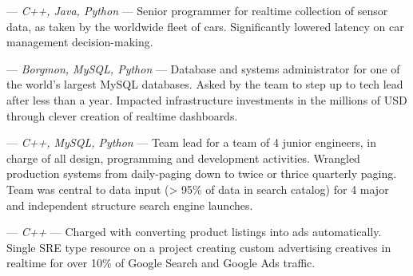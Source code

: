 \vspace{4 mm}

\begin{langen}
\begin{description}%
\vspace{2 mm}
\item[Street View] --- \textit{C++, Java, Python} --- Senior programmer for realtime collection of sensor data, as taken by the worldwide fleet of cars. Significantly lowered latency on car management decision-making.
\item[Ads-SRE-DB] --- \textit{Borgmon, MySQL, Python} --- Database and systems administrator for one of the world's largest MySQL databases. Asked by the team to step up to tech lead after less than a year. Impacted infrastructure investments in the millions of USD through clever creation of realtime dashboards.
\item [Froogle \& Google Base] --- \textit{C++, MySQL, Python} --- Team lead for a team of 4 junior engineers, in charge of all design, programming and development activities. Wrangled production systems from daily-paging down to twice or thrice quarterly paging. Team was central to data input (> 95\% of data in search catalog) for 4 major and independent structure search engine launches.
\item[Ads/Deli] --- \textit{C++} --- Charged with converting product listings into ads automatically. Single SRE type resource on a project creating custom advertising creatives in realtime for over 10\% of Google Search and Google Ads traffic.
\end{description}
\end{langen}

